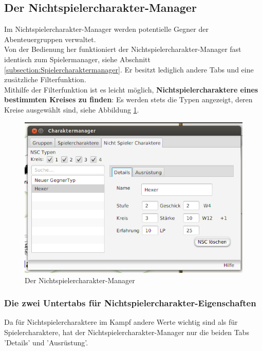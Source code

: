 \documentclass[11pt, a4paper, german]{article}
\begin{document}
\subsection{Der Nichtspielercharakter-Manager}
Im Nichtspielercharakter-Manager werden potentielle Gegner der Abenteuergruppen verwaltet. \\

Von der Bedienung her funktioniert der Nichtspielercharakter-Manager fast identisch zum Spielermanager, siehe Abschnitt \ref{subsection:Spielercharaktermanager}. Er besitzt lediglich andere Tabs und eine zusätzliche Filterfunktion.\\

Mithilfe der Filterfunktion ist es leicht möglich, \textbf{Nichtspielercharaktere eines bestimmten Kreises zu finden}: Es werden stets die Typen angezeigt, deren Kreise ausgewählt sind, siehe Abbildung \ref{fig:Nichtspielertypmanager1}.
\begin{figure}
\centering
\includegraphics[width=1\linewidth]{Bilder/Nichtspielertypmanager1}
\caption{Der Nichtspielercharakter-Manager}
\label{fig:Nichtspielertypmanager1}
\end{figure}


\subsubsection{Die zwei Untertabs für Nichtspielercharakter-Eigenschaften}
Da für Nichtspielercharaktere im Kampf andere Werte wichtig sind als für Spielercharaktere, hat der Nichtspielercharakter-Manager nur die beiden Tabs 'Details' und 'Ausrüstung'.\\
\end{document}
